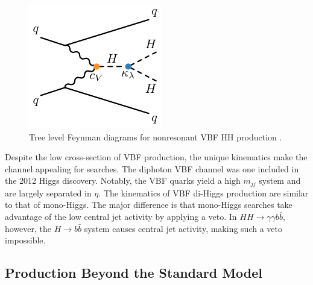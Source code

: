 \begin{figure}[!thp]
\begin{minipage}[c]{.31\textwidth}
    \end{minipage}
    \begin{minipage}[c]{.31\textwidth}
        \includegraphics[width=\textwidth]{chapters/chapter1_theory/images/vbf_klambda.pdf}
    \end{minipage}

    \caption{Tree level Feynman diagrams for nonresonant VBF HH production \cite{vbf_4b}.}
    \label{fig:vbf_feyn}
\end{figure}

Despite the low cross-section of \gls{VBF} production, the unique kinematics make the channel appealing for searches. The diphoton \gls{VBF} channel was one included in the 2012 Higgs discovery. Notably, the \gls{VBF} quarks yield a high $m_{jj}$ system and are largely separated in $\eta$. The kinematics of \gls{VBF} di-Higgs production are similar to that of mono-Higgs. The major difference is that mono-Higgs searches take advantage of the low central jet activity by applying a veto. In $HH \rightarrow \gamma \gamma b\bar{b}$, however, the $H \rightarrow b\bar{b}$ system causes central jet activity, making such a veto impossible.


\subsection{Production Beyond the Standard Model}

